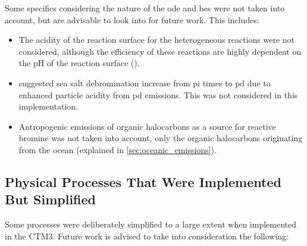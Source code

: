 Some specifics considering the nature of the \acrshort{ode} and \acrfull{be}s were not taken into account, but are advisable to look into for future work. This includes: 
\begin{itemize}
    \item The acidity of the reaction surface for the heterogeneous reactions were not considered, although the efficiency of these reactions are highly dependent on the pH of the reaction surface (\cite{KerriAPratt2013}).
    \item \cite{Parella} suggested sea salt debromination increase from \acrlong{pi} times to \acrlong{pd} due to enhanced particle acidity from \acrlong{pd} emissions. This was not considered in this implementation.
    \item Antropogenic emissions of organic halocarbons as a source for reactive bromine was not taken into account, only the organic halocarbons originating from the ocean (explained in \ref{sec:oceanic_emissions}).  
\end{itemize}

\subsection{Physical Processes That Were Implemented But Simplified}

Some processes were deliberately simplified to a large extent when implemented in the CTM3. Future work is advised to take into consideration the following: 


